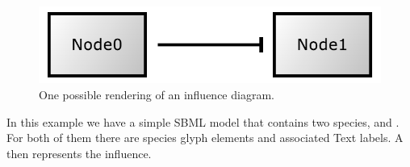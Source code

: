 \begin{figure}[h]
\includegraphics{figures/GeneralGlyphExample}
\caption{One possible rendering of an influence diagram.}
\end{figure}

In this example we have a simple SBML model that contains two species, 
 and . For both of them there are species glyph
elements and associated Text labels. A \GeneralGlyph then represents the
influence. 




